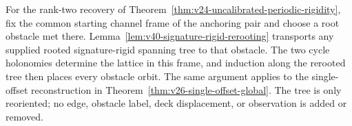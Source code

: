 For the rank-two recovery of
Theorem~\ref{thm:v24-uncalibrated-periodic-rigidity}, fix the common
starting channel frame of the anchoring pair and choose a root obstacle
met there.  Lemma~\ref{lem:v40-signature-rigid-rerooting} transports any
supplied rooted signature-rigid spanning tree to that obstacle.  The two
cycle holonomies determine the lattice in this frame, and induction along
the rerooted tree then places every obstacle orbit.  The same argument
applies to the single-offset reconstruction in
Theorem~\ref{thm:v26-single-offset-global}.  The tree is only reoriented;
no edge, obstacle label, deck displacement, or observation is added or
removed.
